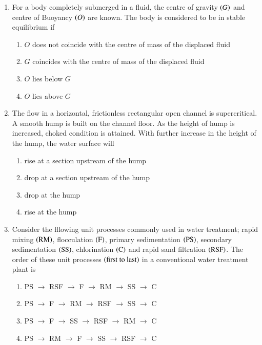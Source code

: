 \documentclass[journal,onecolumn]{IEEEtran}
\theoremstyle{remark}
\begin{document}
\begin{enumerate}
    \item For a body completely submerged in a fluid, the centre of gravity $\left(G\right)$ and centre of Buoyancy $\left(O\right)$ are known. The body is considered to be in stable equilibrium if

	\begin{enumerate}
		\item $O$ does not coincide with the centre of mass of the displaced fluid
		\item $G$ coincides with the centre of mass of the displaced fluid
		\item $O$ lies below $G$
		\item $O$ lies above $G$
	\end{enumerate}

    \item The flow in a horizontal, frictionless rectangular open channel is supercritical. A smooth hump is built on the channel floor. As the height of hump is increased, choked condition is attained. With further increase in the height of the hump, the water surface will

	\begin{enumerate}
		\item rise at a section upstream of the hump
		\item drop at a section upstream of the hump
		\item drop at the hump
		\item rise at the hump
	\end{enumerate}

    \item Consider the fllowing unit processes commonly used in water treatment; rapid mixing $\left(\text{RM}\right)$, flocculation $\left(\text{F}\right)$, primary sedimentation $\left(\text{PS}\right)$, secondary sedimentation $\left(\text{SS}\right)$, chlorination $\left(\text{C}\right)$ and rapid sand filtration $\left(\text{RSF}\right)$. The order of these unit processes $\left(\text{first to last}\right)$ in a conventional water treatment plant is
	\begin{enumerate}
		\item PS $\to$ RSF $\to$ F $\to$ RM $\to$ SS $\to$ C
		\item PS $\to$ F $\to$ RM $\to$ RSF $\to$ SS $\to$ C
		\item PS $\to$ F $\to$ SS $\to$ RSF $\to$ RM $\to$ C
		\item PS $\to$ RM $\to$ F $\to$ SS $\to$ RSF $\to$ C
	\end{enumerate}



\end{enumerate}
\end{document}
